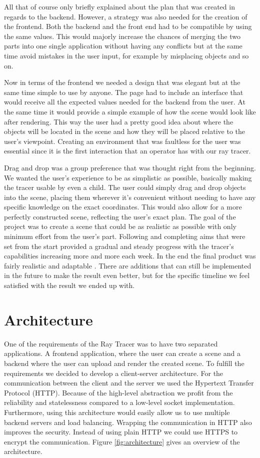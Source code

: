 \documentclass[10pt]{scrartcl}
\begin{document}
All that of course only briefly explained about the plan that was created in regards to the backend. However, a strategy was also needed for the creation of the frontend. Both the backend and the front end had to be compatible by using the same values. This would majorly increase the chances of merging the two parts into one single application without having any conflicts but at the same time avoid mistakes in the user input, for example by misplacing objects and so on.\par
Now in terms of the frontend we needed a design that was elegant but at the same time simple to use by anyone. The page had to include an interface that would receive all the expected values needed for the backend from the user. At the same time it would provide a simple example of how the scene would look like after rendering. This way the user had a pretty good idea about where the objects will be located in the scene and how they will be placed relative to the user’s viewpoint. Creating an environment that was faultless for the user was essential since it is the first interaction that an operator has with our ray tracer.\par
Drag and drop was a group preference that was thought right from the beginning. We wanted the user’s experience to be as simplistic as possible, basically making the tracer usable by even a child. The user could simply drag and drop objects into the scene, placing them wherever it’s convenient without needing to have any specific knowledge on the exact coordinates. This would also allow for a more perfectly constructed scene, reflecting the user’s exact plan.
The goal of the project was to create a scene that could be as realistic as possible with only minimum effort from the user’s part. Following and completing aims that were set from the start provided a gradual and steady progress with the tracer’s capabilities increasing more and more each week. In the end the final product was fairly realistic and adaptable . There are additions that can still be implemented in the future to make the result even better, but for the specific timeline we feel satisfied with the result we ended up with.\par

\section{Architecture}

One of the requirements of the Ray Tracer was to have two separated applications. A frontend application, where the user can create a scene and a backend where the user can upload and render the created scene. To fulfill the requirements we decided to develop a client-server architecture. For the communication between the client and the server we used the Hypertext Transfer Protocol (HTTP). Because of the high-level abstraction we profit from the reliability and statelessness compared to a low-level socket implementation. Furthermore, using this architecture would easily allow us to use multiple backend servers and load balancing. Wrapping the communication in HTTP also improves the security. Instead of using plain HTTP we could use HTTPS to encrypt the communication. Figure \ref{fig:architecture} gives an overview of the architecture. 
\end{document}
